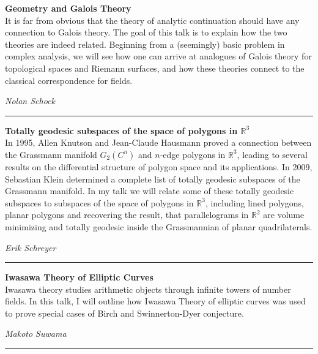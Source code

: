 \documentclass[oneside]{amsart}
\begin{document}
\filbreak
\hspace{-20pt}\textbf{ \textbf{ Geometry and Galois Theory } } \vspace{0.5em}\\
It is far from obvious that the theory of analytic continuation should have any connection to Galois theory. The goal of this talk is to explain how the two theories are indeed related. Beginning from a (seemingly) basic problem in complex analysis, we will see how one can arrive at analogues of Galois theory for topological spaces and Riemann surfaces, and how these theories connect to the classical correspondence for fields. \vspace{-1em}\\
\begin{flushright} \textit{ Nolan Schock } \vspace{0.5em} \end{flushright}
\rule{\textwidth}{0.4pt}
\vspace{0.5em}

\filbreak
\hspace{-20pt}\textbf{ \textbf{ Totally geodesic subspaces of the space of polygons in \(\mathbb{R}^3\) } } \vspace{0.5em}\\
In 1995, Allen Knutson and Jean-Claude Hausmann proved a connection between the Grassmann manifold \(G_2(C^n)\) and \(n\)-edge polygons in \(\mathbb{R}^3\), leading to several results on the differential structure of polygon space and its applications. In 2009, Sebastian Klein determined a complete list of totally geodesic subspaces of the Grassmann manifold. In my talk we will relate some of these totally geodesic subspaces to subspaces of the space of polygons in \(\mathbb{R}^3\), including lined polygons, planar polygons and recovering the result, that parallelograms in \(\mathbb{R}^2\) are volume minimizing and totally geodesic inside the Grassmannian of planar quadrilaterals. \vspace{-1em}\\
\begin{flushright} \textit{ Erik Schreyer } \vspace{0.5em} \end{flushright}
\rule{\textwidth}{0.4pt}
\vspace{0.5em}

\filbreak
\hspace{-20pt}\textbf{ \textbf{ Iwasawa Theory of Elliptic Curves } } \vspace{0.5em}\\
Iwasawa theory studies arithmetic objects through infinite towers of number fields. In this talk, I will outline how Iwasawa Theory of elliptic curves was used to prove special cases of Birch and Swinnerton-Dyer conjecture. \vspace{-1em}\\
\begin{flushright} \textit{ Makoto Suwama } \vspace{0.5em} \end{flushright}
\rule{\textwidth}{0.4pt}
\vspace{0.5em}
\end{document}
